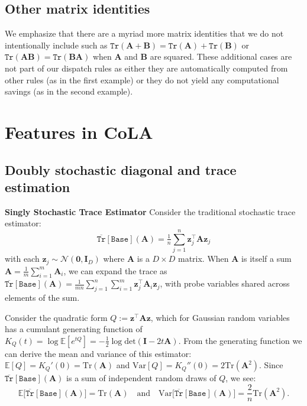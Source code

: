 \documentclass{article}
\newcommand{\mbf}[1]{{\boldsymbol{\mathbf{#1}}}}
\renewcommand{\bm}{\mbf}
\begin{document}
\subsection{Other matrix identities}
We emphasize that there are a myriad more matrix identities that we do not intentionally include
such as $\texttt{Tr}(\bm{A} + \bm{B}) = \texttt{Tr}(\bm{A}) + \texttt{Tr}(\bm{B})$ or $\texttt{Tr}(\bm{A} \bm{B}) = \texttt{Tr}(\bm{B} \bm{A})$ when $\bm{A}$ and
$\bm{B}$ are squared.
These additional cases are not part of our dispatch rules as either they are automatically computed from other rules (as in the first example)
or they do not yield any computational savings (as in the second example).

\section{Features in CoLA} \label{app:features}
\subsection{Doubly stochastic diagonal and trace estimation} \label{app:diagonal_estimator}
\textbf{Singly Stochastic Trace Estimator} \quad
Consider the traditional stochastic trace estimator:
\begin{equation}
  \overline{\texttt{Tr}}[\texttt{Base}](\bm A) = \tfrac{1}{n}\sum_{j=1}^n \bm{z}^{\intercal}_j \bm{A} \bm{z}_j
\end{equation}
with each $\bm{z}_{j} \sim \mathcal{N}(\bm{0},\bm{I}_{D})$ where $\bm{A}$ is a $D\times D$ matrix.
When $\bm A$ is itself a sum $\bm A = \tfrac{1}{m}\sum_{i=1}^m \bm A_i$, we can expand the trace as $ \overline{\texttt{Tr}}[\texttt{Base}](\bm A) = \tfrac{1}{mn}\sum_{j=1}^n\sum_{i=1}^m \bm{z}^{\intercal}_j \bm{A}_i \bm{z}_j$, with probe variables shared across elements of the sum.

Consider the quadratic form $Q:=\bm{z}^{\intercal} \bm{A} \bm{z}$, which for Gaussian random variables has a
cumulant generating function of $K_Q(t) = \log \mathbb{E}[e^{tQ}] = -\tfrac{1}{2} \log \mathrm{det}(\bm I-2t\bm A)$.
From the generating function we can derive the mean and variance of this estimator: $\mathbb{E}[Q] = K_Q'(0) = \mathrm{Tr}(\bm A)$ and $\mathrm{Var}[Q] = K_Q''(0) = 2 \mathrm{Tr}(\bm A^2)$.
Since $\overline{\texttt{Tr}}[\texttt{Base}](\bm A)$ is a sum of independent random draws of $Q$, we see:
\begin{equation}
    \mathbb{E}\big[\overline{\texttt{Tr}}[\texttt{Base}](\bm A)\big] = \mathrm{Tr}(\bm A) \quad \mathrm{and}\quad \mathrm{Var}\big[\overline{\texttt{Tr}}[\texttt{Base}](\bm A)\big] = \frac{2}{n} \mathrm{Tr}(\bm A^2).
\end{equation}
\end{document}
